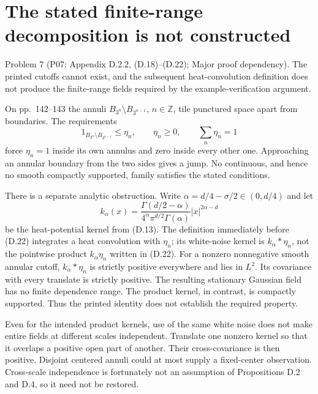\documentclass[10pt]{article}
\begin{document}
\section*{The stated finite-range decomposition is not constructed}
Problem 7 (P07: Appendix D.2.2, (D.18)–(D.22); Major proof dependency).  The printed cutoffs cannot exist, and the subsequent heat-convolution definition does not produce the finite-range fields required by the example-verification argument.\par
On pp. 142–143 the annuli \(B_{3^n}\setminus B_{3^{n-1}}\), \(n\in\mathbb Z\), tile punctured space apart from boundaries. The requirements \[1_{B_{3^n}\setminus B_{3^{n-1}}}\le\eta_n,\qquad
 \eta_n\ge0,\qquad \sum_n\eta_n=1\] force \(\eta_n=1\) inside its own annulus and zero inside every other one. Approaching an annular boundary from the two sides gives a jump. No continuous, and hence no smooth compactly supported, family satisfies the stated conditions.\par
There is a separate analytic obstruction. Write \(\alpha=d/4-\sigma/2\in(0,d/4)\) and let \[k_\alpha(x)=
 \frac{\Gamma(d/2-\alpha)}
 {4^\alpha\pi^{d/2}\Gamma(\alpha)}
 |x|^{2\alpha-d}\] be the heat-potential kernel from (D.13). The definition immediately before (D.22) integrates a heat convolution with \(\eta_n\); its white-noise kernel is \(k_\alpha*\eta_n\), not the pointwise product \(k_\alpha\eta_n\) written in (D.22). For a nonzero nonnegative smooth annular cutoff, \(k_\alpha*\eta_n\) is strictly positive everywhere and lies in \(L^2\). Its covariance with every translate is strictly positive. The resulting stationary Gaussian field has no finite dependence range. The product kernel, in contrast, is compactly supported. Thus the printed identity does not establish the required property.\par
Even for the intended product kernels, use of the same white noise does not make entire fields at different scales independent. Translate one nonzero kernel so that it overlaps a positive open part of another. Their cross-covariance is then positive. Disjoint centered annuli could at most supply a fixed-center observation. Cross-scale independence is fortunately not an assumption of Propositions D.2 and D.4, so it need not be restored.\par
\end{document}
